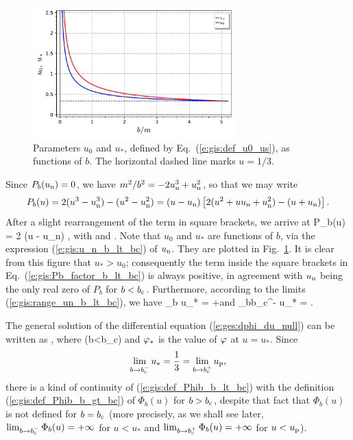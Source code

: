\begin{figure}
\centerline{\includegraphics[width=0.7\textwidth]{gis_u0_us_b.pdf}}
\caption[]{\label{f:gis:u0_us_b} \footnotesize
Parameters $u_0$ and $u_*$, defined by Eq.~(\ref{e:gis:def_u0_us}), as functions
of $b$. The horizontal dashed line marks $u=1/3$.}
\end{figure}


Since $P_b(u_{\rm n}) = 0$, we have $m^2/b^2 = - 2 u_{\rm n}^3 + u_{\rm n}^2$,
so that we may write
\[
    P_b(u) = 2 (u^3 - u_{\rm n}^3) - (u^2 - u_{\rm n}^2)
        = (u - u_{\rm n}) \left[ 2(u^2 + u u_{\rm n} + u_{\rm n}^2)
            - (u + u_{\rm n}) \right] .
\]
After a slight rearrangement of the term in square brackets, we arrive at
\be \label{e:gis:Pb_factor_b_lt_bc}
    P_b(u) = 2 (u - u_{\rm n}) \left[
        (u - u_0)^2 + (u_* - u_{\rm n})^2 - (u_0 - u_{\rm n})^2 \right] ,
\ee
with
\be \label{e:gis:def_u0_us}
    \qquad\mbox{and}\qquad
   .
\ee
Note that $u_0$ and $u_*$ are functions
of $b$, via the expression (\ref{e:gis:u_n_b_lt_bc}) of $u_{\rm n}$.
They are plotted in Fig.~\ref{f:gis:u0_us_b}. It is clear from this figure
that $u_* > u_0$; consequently the term inside the square brackets in
Eq.~(\ref{e:gis:Pb_factor_b_lt_bc}) is always positive, in agreement with
$u_{\rm n}$ being the only real
zero of $P_b$ for $b < b_{\rm c}$.
Furthermore, according to the limits (\ref{e:gis:range_un_b_lt_bc}), we have
\be \label{e:gis:lim_us}
    \lim_{b} u_* = +\infty \qquad\mbox{and}\qquad
    \lim_{b\to b_{\rm c}^-} u_* =  .
\ee

The general solution of the differential equation
(\ref{e:ges:dphi_du_null}) can be written as
\be \label{e:gis:ph_phs_Phib}
   ,
\ee
where
\be \label{e:gis:def_Phib_b_lt_bc}
     \quad (b<b_{\rm c})
\ee
and $\varphi_*$ is the value of $\varphi$ at $u=u_*$. Since
\[
    \lim_{b\to b_{\rm c}^-} u_* = \frac{1}{3} = \lim_{b\to b_{\rm c}^+} u_{\rm p},
\]
there is a kind of continuity of (\ref{e:gis:def_Phib_b_lt_bc})
with the definition (\ref{e:gis:def_Phib_b_gt_bc}) of $\Phi_b(u)$ for
$b>b_{\rm c}$, despite that fact that $\Phi_b(u)$ is not defined
for $b=b_{\rm c}$ (more precisely, as we shall see later,
$\lim_{b\to b_{\rm c}^-} \Phi_b(u) = + \infty$ for $u<u_*$ and
$\lim_{b\to b_{\rm c}^+} \Phi_b(u) = + \infty$ for $u<u_{\rm p}$).

